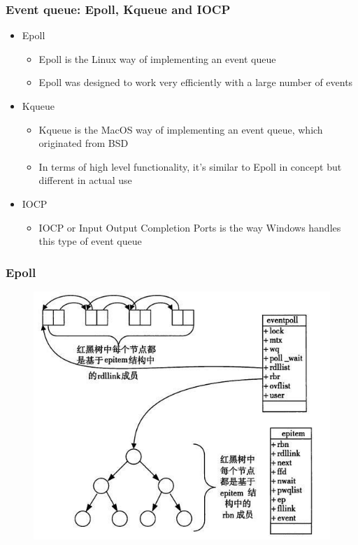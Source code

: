 \begin{frame}[fragile]
    \frametitle{Event queue: Epoll, Kqueue and IOCP}
% 
% 
% 
    \begin{itemize}
        \item Epoll
    	\begin{itemize}
    	    \item Epoll is the Linux way of implementing an event queue
    	    \item Epoll was designed to work very efficiently with a large number of events
    	\end{itemize}
        \item Kqueue
    	\begin{itemize}
    	    \item Kqueue is the MacOS way of implementing an event queue, which originated from BSD
    	    \item In terms of high level functionality, it's similar to Epoll in concept but different in actual use
    	\end{itemize}
        \item IOCP
    	\begin{itemize}
    	    \item IOCP or Input Output Completion Ports is the way Windows handles this type of event queue
    	\end{itemize}
    \end{itemize}

\end{frame}
\begin{frame}[fragile]
    \frametitle{Epoll}
% 
% 
    \begin{figure}
    \includegraphics[width=0.55\linewidth]{figs/epoll.png}
    \end{figure}
% 
\end{frame}
